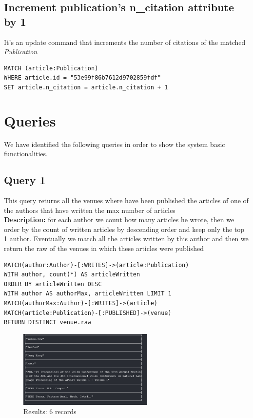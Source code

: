 \documentclass{Configuration_Files/PoliMi3i_thesis}
\begin{document}
\subsection{Increment publication's n\_citation attribute by 1}
It's an update command that increments the number of citations of the matched \emph{Publication}
\begin{lstlisting}[language=cypher, label=lst:cypher-example]
MATCH (article:Publication)
WHERE article.id = "53e99f86b7612d9702859fdf"
SET article.n_citation = article.n_citation + 1
\end{lstlisting}

\section{Queries}
We have identified the following queries in order to show the system basic functionalities.

\subsection{Query 1}
This query returns all the venues where have been published the articles of one of the authors that have written the max number of articles\\
\textbf{Description:} for each author we count how many articles he wrote, then we order by the count of written articles by descending order and keep only the top 1 author. 
Eventually we match all the articles written by this author and then we return the raw of the venues in which these articles were published
\begin{lstlisting}[language=cypher, label=lst:cypher-example]
MATCH(author:Author)-[:WRITES]->(article:Publication)
WITH author, count(*) AS articleWritten
ORDER BY articleWritten DESC
WITH author AS authorMax, articleWritten LIMIT 1
MATCH(authorMax:Author)-[:WRITES]->(article)
MATCH(article:Publication)-[:PUBLISHED]->(venue)
RETURN DISTINCT venue.raw
\end{lstlisting}
\begin{figure}[H]
\centering
\includegraphics[width=0.6\textwidth]{query/query1.PNG}
\caption{Results: 6 records}
\label{fig:query1}
\end{figure}
\end{document}
